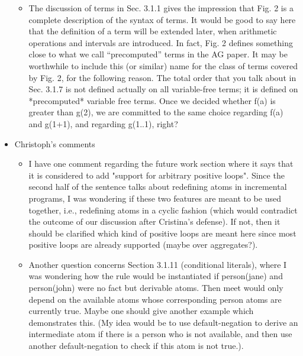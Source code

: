 \begin{itemize}
\begin{itemize}
 \item
  The discussion of terms in Sec. 3.1.1 gives the impression that Fig. 2 is a
  complete description of the syntax of terms.  It would be good to say here
  that the definition of a term will be extended later, when arithmetic
  operations and intervals are introduced.  In fact, Fig. 2 defines something
  close to what we call “precomputed” terms in the AG paper.  It may be
  worthwhile to include this (or similar) name for the class of terms covered
  by Fig. 2, for the following reason.  The total order that you talk about
  in Sec. 3.1.7 is not defined actually on all variable-free terms; it is
  defined on *precomputed* variable free terms.  Once we decided whether f(a)
  is greater than g(2), we are committed to the same choice regarding f(a)
  and g(1+1), and regarding g(1..1), right?
  \end{itemize}
\item Christoph's comments
  \begin{itemize}
  \item 
    I have one comment regarding the future work section where it says that it
    is considered to add "support for arbitrary positive loops". Since the
    second half of the sentence talks about redefining atoms in incremental
    programs, I was wondering if these two features are meant to be used
    together, i.e., redefining atoms in a cyclic fashion (which would
    contradict the outcome of our discussion after Cristina's defense). If not,
    then it should be clarified which kind of positive loops are meant here
    since most positive loops are already supported (maybe over aggregates?).
  \item 
    Another question concerns Section 3.1.11 (conditional literals), where I
    was wondering how the rule would be instantiated if person(jane) and
    person(john) were no fact but derivable atoms. Then meet would only depend
    on the available atoms whose corresponding person atoms are currently true.
    Maybe one should give another example which demonstrates this. (My idea
    would be to use default-negation to derive an intermediate atom if there is
    a person who is not available, and then use another default-negation to
    check if this atom is not true.).
\end{itemize}
\end{itemize}

